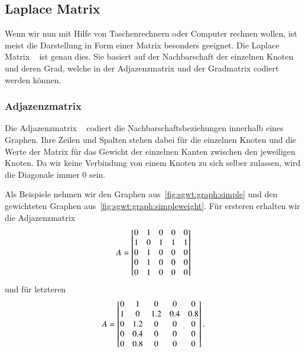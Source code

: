 \subsection{Laplace Matrix\label{subsec:sgwt:laplacem}}

Wenn wir nun mit Hilfe von Taschenrechnern oder Computer rechnen wollen, ist 
meist die Darstellung in Form einer Matrix besonders geeignet. Die Laplace 
Matrix \laplaceL{}~\cite{noauthor_laplace-matrix_2017} ist genau 
dies. Sie basiert auf der Nachbarschaft der einzelnen Knoten und deren Grad, 
welche in der Adjazenzmatrix und der Gradmatrix codiert werden k\"onnen.

\subsubsection{Adjazenzmatrix \texorpdfstring{\adjacencyM{}}{A}}

Die Adjazenzmatrix \adjacencyM{}~\cite{noauthor_adjacency_2019} codiert die 
Nachbarschaftsbeziehungen innerhalb eines Graphen. Ihre Zeilen und Spalten 
stehen dabei f\"ur die einzelnen Knoten und die Werte der Matrix f\"ur das 
Gewicht der einzelnen Kanten zwischen den jeweiligen Knoten. Da wir keine 
Verbindung von einem Knoten zu sich selber zulassen, wird die Diagonale immer 
$0$ sein. 

Als Beispiele nehmen wir den Graphen aus~\cref{fig:sgwt:graph:simple} und den 
gewichteten Graphen aus~\cref{fig:sgwt:graph:simpleweight}. F\"ur ersteren 
erhalten wir die Adjazenzmatrix
\begin{equation*}
\adjacencyM =
\begin{bmatrix}
0 & 1 & 0 & 0 & 0 \\
1 & 0 & 1 & 1 & 1 \\
0 & 1 & 0 & 0 & 0 \\
0 & 1 & 0 & 0 & 0 \\
0 & 1 & 0 & 0 & 0
\end{bmatrix}
\end{equation*}
und f\"ur letzteren
\begin{equation*}
\adjacencyM =
\begin{bmatrix}
0 & 1 & 0 & 0 & 0 \\
1 & 0 & 1.2 & 0.4 & 0.8 \\
0 & 1.2 & 0 & 0 & 0 \\
0 & 0.4 & 0 & 0 & 0 \\
0 & 0.8 & 0 & 0 & 0
\end{bmatrix}.
\end{equation*}

